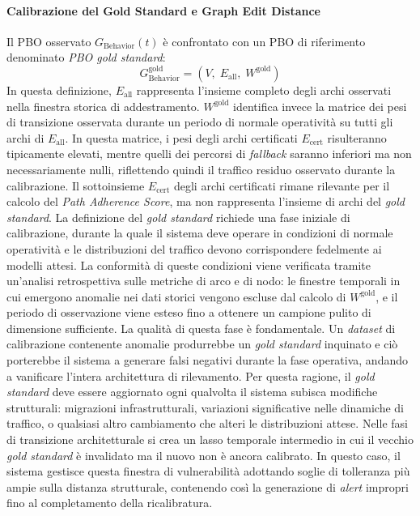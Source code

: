 \paragraph{Calibrazione del Gold Standard e Graph Edit Distance}
\label{sec:gold_standard_ged}

Il \gls{PBO} osservato $G_{\text{Behavior}}(t)$ è confrontato con un \gls{PBO} di riferimento
denominato \textit{PBO gold standard}:
\begin{equation}
\label{eq:pbo_gold}
G_{\text{Behavior}}^{\text{gold}} = (V,\; E_{\text{all}},\; W^{\text{gold}})
\end{equation}
In questa definizione, $E_{\text{all}}$ rappresenta l'insieme completo degli archi osservati nella
finestra storica di addestramento. $W^{\text{gold}}$ identifica invece la matrice dei pesi di
transizione osservata durante un periodo di normale operatività su tutti gli archi di $E_{\text{all}}$.
In questa matrice, i pesi degli archi certificati $E_{\text{cert}}$ risulteranno tipicamente
elevati, mentre quelli dei percorsi di \textit{fallback} saranno inferiori ma non necessariamente
nulli, riflettendo quindi il traffico residuo osservato durante la calibrazione. Il sottoinsieme
$E_{\text{cert}}$ degli archi certificati rimane rilevante per il calcolo del \textit{Path
Adherence Score}, ma non rappresenta l'insieme di archi del \textit{gold standard}. La definizione
del \textit{gold standard} richiede una fase iniziale di calibrazione, durante la quale il sistema
deve operare in condizioni di normale operatività e le distribuzioni del traffico devono
corrispondere fedelmente ai modelli attesi. La conformità di queste condizioni viene verificata
tramite un'analisi retrospettiva sulle metriche di arco e di nodo: le finestre temporali in cui
emergono anomalie nei dati storici vengono escluse dal calcolo di $W^{\text{gold}}$, e il periodo
di osservazione viene esteso fino a ottenere un campione pulito di dimensione sufficiente. La
qualità di questa fase è fondamentale. Un \textit{dataset} di calibrazione contenente anomalie
produrrebbe un \textit{gold standard} inquinato e ciò porterebbe il sistema a generare falsi
negativi durante la fase operativa, andando a vanificare l'intera architettura di rilevamento.
Per questa ragione, il \textit{gold standard} deve essere aggiornato ogni qualvolta il sistema
subisca modifiche strutturali: migrazioni infrastrutturali, variazioni significative nelle
dinamiche di traffico, o qualsiasi altro cambiamento che alteri le distribuzioni attese. Nelle fasi
di transizione architetturale si crea un lasso temporale intermedio in cui il vecchio
\textit{gold standard} è invalidato ma il nuovo non è ancora calibrato. In questo caso, il sistema
gestisce questa finestra di vulnerabilità adottando soglie di tolleranza più ampie sulla distanza
strutturale, contenendo così la generazione di \textit{alert} impropri fino al completamento della
ricalibratura.

